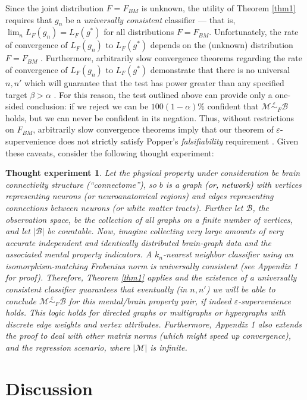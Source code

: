 \documentclass[10pt]{article}
\newcommand{\mB}{\mathcal{B}}
\newcommand{\mM}{\mathcal{M}}
\newcommand{\MeB}{\mM \overset{\varepsilon}{{\sim}}_F \mB}
\providecommand{\tr}[1]{\textcolor{black}{#1}}
\newtheorem{thex}{Thought experiment}
\begin{document}
Since the joint distribution $F=F_{BM}$ is unknown, the utility of Theorem \ref{thm1} requires that $g_n$ be a {\it universally consistent} classifier --- that is, $\lim_n L_{F}(g_n) = L_{F}(g^*)$ for all distributions $F=F_{BM}$. Unfortunately, the rate of convergence of $L_{F}(g_n)$ to $L_{F}(g^*)$ depends on the (unknown) distribution $F=F_{BM}$ \cite{DGL96}. Furthermore, arbitrarily slow convergence theorems regarding the rate of convergence of $L_{F}(g_n)$ to $L_{F}(g^*)$ demonstrate that there is no universal $n,n'$ which will guarantee that the test has power greater than any specified target $\beta > \alpha$ \cite{Devroye83}. For this reason, the test outlined above can provide only a one-sided conclusion: if we reject we can be $100(1-\alpha)$\% confident that $\MeB$ holds, but we can never be confident in its negation. Thus, without restrictions on $F_{BM}$, arbitrarily slow convergence theorems imply that our theorem of $\varepsilon$-supervenience does not \tr{strictly} satisfy Popper's {\it falsifiability} requirement \cite{Popper}. Given these caveats, consider the following thought experiment:

\begin{thex}
Let the physical property under consideration be brain connectivity structure (``connectome''), so $b$ is a graph \tr{(or, network)} with vertices representing neurons (or neuroanatomical regions) and edges representing connections between neurons (or white matter tracts). Further let $\mB$, the observation space, be the collection of all graphs on a finite number of vertices, and let $|\mB|$ be countable. Now, imagine collecting very large amounts of very accurate independent and identically distributed brain-graph data and the associated mental property indicators. A $k_n$-nearest neighbor classifier using an isomorphism-matching Frobenius norm is universally consistent (see Appendix 1 for proof). Therefore, Theorem \ref{thm1} applies and the existence of a universally consistent classifier guarantees that eventually (in $n,n'$) we will be able to conclude $\MeB$ for this mental/brain property pair, if indeed $\varepsilon$-supervenience holds. This logic holds for directed graphs or multigraphs or hypergraphs with discrete edge weights and vertex attributes. Furthermore, Appendix 1 also extends the proof to deal with other matrix norms (which might speed up convergence), and the regression scenario, where $|\mM|$ is infinite.  
\end{thex}

\section*{Discussion}
\end{document}
